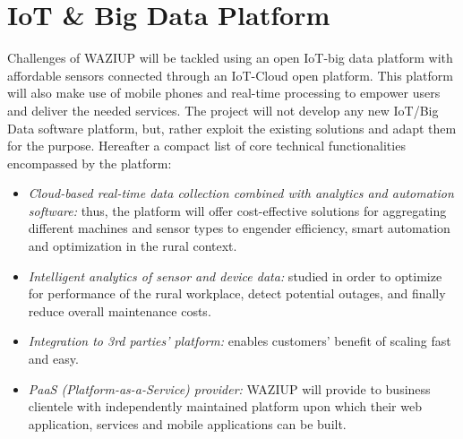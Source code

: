 
\section{IoT \& Big Data Platform}

Challenges of WAZIUP will be tackled using an open IoT-big data platform with affordable sensors connected through an IoT-Cloud open platform.
This platform will also make use of mobile phones and real-time processing to empower users and deliver the needed services.
The project will not develop any new IoT/Big Data software platform, but, rather exploit the existing solutions and adapt them for the purpose. Hereafter a compact list of core technical functionalities encompassed by the platform:

\begin{itemize}
   \item \emph{Cloud-based real-time data collection combined with analytics and automation software:} thus, the platform will offer cost-effective solutions for aggregating different machines and sensor types to engender efficiency, smart automation and optimization in the rural context.
   \item \emph{Intelligent analytics of sensor and device data:} studied in order to optimize for performance of the rural workplace, detect potential outages, and finally reduce overall maintenance costs.
   \item \emph{Integration to 3rd parties' platform:} enables customers' benefit of scaling fast and easy.
   \item \emph{PaaS (Platform-as-a-Service) provider:} WAZIUP will provide to business clientele with independently maintained platform upon which their web application, services and mobile applications can be built.
\end{itemize}


